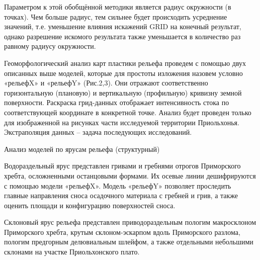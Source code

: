 \documentclass[runningheads]{AIIT}
\begin{document}
Параметром к этой обобщённой методики является радиус окружности (в точках). Чем больше радиус, тем сильнее будет происходить усреднение значений, т.е. уменьшение влияния искажений GRID на конечный результат, однако разрешение искомого результата также уменьшается в количество раз равному радиусу окружности.

Геоморфологический анализ карт пластики рельефа проведем с помощью двух описанных выше моделей, которые для простоты изложения назовем условно «рельефX» и «рельефY» (Рис.2,3). Они отражают соответственно горизонтальную (плановую) и вертикальную (профильную) кривизну земной поверхности. Раскраска грид-данных отображает интенсивность стока по соответствующей координате в конкретной точке. Анализ будет проведен только для изображенной на рисунках части исследуемой территории Приольхонья. Экстраполяция данных – задача последующих исследований.

Анализ моделей по ярусам рельефа (структурный)

Водораздельный ярус представлен гривами и гребнями отрогов Приморского хребта, осложненными останцовыми формами. Их осевые линии дешифрируются с помощью модели «рельефX». Модель «рельефY» позволяет проследить главные направления сноса осадочного материала с гребней и грив, а также оценить площади и конфигурацию поверхностей сноса.

Склоновый ярус рельефа представлен приводораздельным пологим макросклоном Приморского хребта, крутым склоном-эскарпом вдоль Приморского разлома, пологим предгорным делювиальным шлейфом, а также отдельными небольшими склонами на участке Приольхонского плато.
\end{document}
